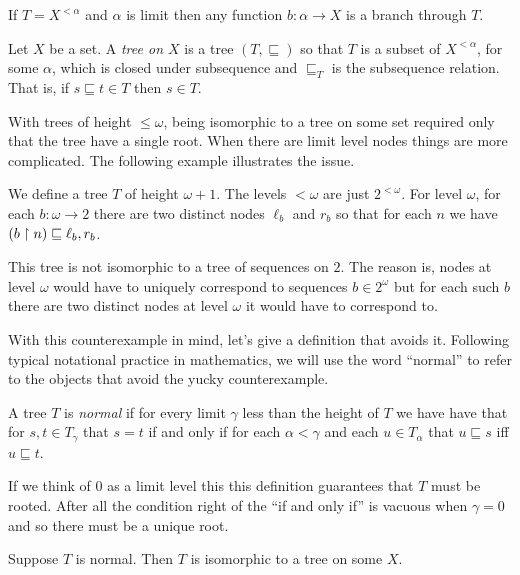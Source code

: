 \documentclass[10pt]{amsart}
\begin{document}
If $T = X^{<\alpha}$ and $\alpha$ is limit then any function $b : \alpha \to X$ is a branch through $T$.

\begin{definition}
Let $X$ be a set. A \emph{tree on $X$} is a tree $(T,\sqsubseteq)$ so that $T$ is a subset of $X^{<\alpha}$, for some $\alpha$, which is closed under subsequence and $\sqsubseteq_T$ is the subsequence relation. That is, if $s \sqsubseteq t \in T$ then $s \in T$.
\end{definition}

With trees of height $\le \omega$, being isomorphic to a tree on some set required only that the tree have a single root. When there are limit level nodes things are more complicated. The following example illustrates the issue.

\begin{example}
We define a tree $T$ of height $\omega + 1$. The levels $<\omega$ are just $2^{<\omega}$. For level $\omega$, for each $b : \omega \to 2$ there are two distinct nodes $\ell_b$ and $r_b$ so that for each $n$ we have $(b \upharpoonright n) \sqsubseteq \ell_b, r_b$. 

This tree is not isomorphic to a tree of sequences on $2$. The reason is, nodes at level $\omega$ would have to uniquely correspond to sequences $b \in 2^\omega$ but for each such $b$ there are two distinct nodes at level $\omega$ it would have to correspond to.
\end{example}

With this counterexample in mind, let's give a definition that avoids it. Following typical notational practice in mathematics, we will use the word ``normal'' to refer to the objects that avoid the yucky counterexample.

\begin{definition}
A tree $T$ is \emph{normal} if for every limit $\gamma$ less than the height of $T$ we have have that for $s,t \in T_\gamma$ that $s = t$ if and only if for each $\alpha < \gamma$ and each $u \in T_\alpha$ that $u \sqsubseteq s$ iff $u \sqsubseteq t$.

If we think of $0$ as a limit level this this definition guarantees that $T$ must be rooted. After all the condition right of the ``if and only if'' is vacuous when $\gamma = 0$ and so there must be a unique root.
\end{definition}

\begin{lemma}
Suppose $T$ is normal. Then $T$ is isomorphic to a tree on some $X$.
\end{lemma}
\end{document}
